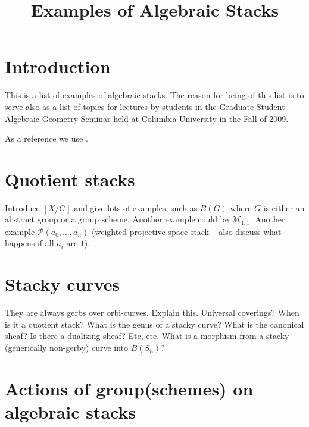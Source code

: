 

%


\title{Examples of Algebraic Stacks}


\maketitle

\label{section-phantom}

\tableofcontents

\section{Introduction}
\label{section-introduction}

\noindent
This is a list of examples of algebraic stacks.
The reason for being of this list is to serve also as a list of
topics for lectures by students in the Graduate Student Algebraic Geometry
Seminar held at Columbia University in the Fall of 2009.

\medskip\noindent
As a reference we use \cite[Section 4]{DM}.


\section{Quotient stacks}
\label{section-quotient-stacks}

\noindent
Introduce $[X/G]$ and give lots of examples, such as
$B(G)$ where $G$ is either an abstract group or a group
scheme. Another example could be $\mathcal{M}_{1, 1}$.
Another example $\mathcal{P}(a_0, \ldots, a_n)$
(weighted projective space stack -- also discuss what happens if
all $a_i$ are $1$).


\section{Stacky curves}
\label{section-stacky-curves}

\noindent
They are always gerbs over orbi-curves. Explain this.
Universal coverings? When is it a quotient stack?
What is the genus of a stacky curve? What is the canonical sheaf?
Is there a dualizing sheaf? Etc, etc.
What is a morphism from a stacky (generically non-gerby) curve
into $B(S_n)$?

\section{Actions of group(schemes) on algebraic stacks}
\label{section-actions}

